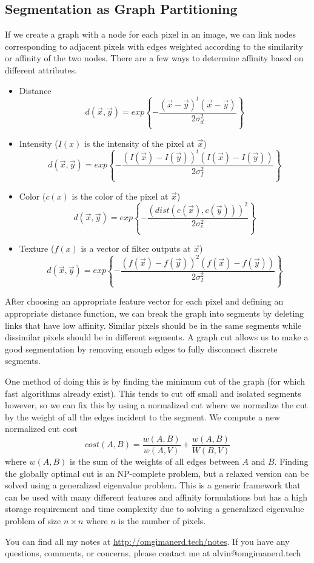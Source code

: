 \documentclass{math}
\begin{document}
\subsection*{Segmentation as Graph Partitioning}
If we create a graph with a node for each pixel in an image, we can link nodes
corresponding to adjacent pixels with edges weighted according to the
similarity or affinity of the two nodes. There are a few ways to determine
affinity based on different attributes.
\begin{itemize}
  \item Distance
  \[ d(\vec{x},\vec{y}) = exp\left\{-\frac{(\vec{x}-\vec{y})^t(\vec{x}-\vec{y})}
    {2\sigma_d^2}\right\} \]
  \item Intensity (\( I(x) \) is the intensity of the pixel at \( \vec{x} \))
  \[ d(\vec{x},\vec{y}) =
    exp\left\{-\frac{(I(\vec{x})-I(\vec{y}))^t(I(\vec{x})-I(\vec{y}))}
    {2\sigma_I^2}\right\} \]
  \item Color (\( c(x) \) is the color of the pixel at \( \vec{x} \))
  \[ d(\vec{x},\vec{y}) =
    exp\left\{-\frac{(dist(c(\vec{x}),c(\vec{y})))^2}{2\sigma_c^2}\right\} \]
  \item Texture (\( f(x) \) is a vector of filter outputs at \( \vec{x} \))
  \[ d(\vec{x},\vec{y}) =
    exp\left\{-\frac{(f(\vec{x})-f(\vec{y}))^2(f(\vec{x})-f(\vec{y}))}
    {2\sigma_I^2}\right\} \]
\end{itemize}
After choosing an appropriate feature vector for each pixel and defining an
appropriate distance function, we can break the graph into segments by
deleting links that have low affinity. Similar pixels should be in the same
segments while dissimilar pixels should be in different segments. A graph cut
allows us to make a good segmentation by removing enough edges to fully
disconnect discrete segments. \par
One method of doing this is by finding the minimum cut of the graph (for which
fast algorithms already exist). This tends to cut off small and isolated
segments however, so we can fix this by using a normalized cut where we
normalize the cut by the weight of all the edges incident to the segment. We
compute a new normalized cut cost
\[ cost(A,B) = \frac{w(A,B)}{w(A,V)}+\frac{w(A,B)}{W(B,V)} \]
where \( w(A,B) \) is the sum of the weights of all edges between \( A \) and
\( B \). Finding the globally optimal cut is an NP-complete problem, but a
relaxed version can be solved using a generalized eigenvalue problem. This is
a generic framework that can be used with many different features and affinity
formulations but has a high storage requirement and time complexity due to
solving a generalized eigenvalue problem of size \( n\times n \) where \( n \)
is the number of pixels.


\begin{center}
  You can find all my notes at \url{http://omgimanerd.tech/notes}. If you have
  any questions, comments, or concerns, please contact me at
  alvin@omgimanerd.tech
\end{center}
\end{document}

